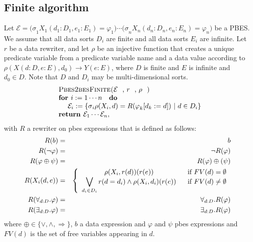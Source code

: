 \documentclass{article}
\begin{document}
\subsection{Finite algorithm}

Let $\mathcal{E=(\sigma }_{1}X_{1}(d_{1}:D_{1},e_{1}:E_{1})=\varphi
_{1})\cdots \mathcal{(\sigma }_{n}X_{n}(d_{n}:D_{n},e_{n}:E_{n})=\varphi
_{n})$ be a PBES. We assume that all data sorts $D_{i}$ are finite and all
data sorts $E_{i}$ are infinite. Let $r$ be a data rewriter, and let $\rho $
be an injective function that creates a unique predicate variable from a
predicate variable name and a data value according to $\rho
(X(d:D,e:E),d_{0})\rightarrow Y(e:E)$, where $D$ is finite and $E$ is
infinite and $d_{0}\in D$. Note that $D$ and $D_{i}$ may be
multi-dimensional sorts.%
\begin{equation*}
\begin{array}{l}
\text{\textsc{Pbes2besFinite(}}\mathcal{E}\text{, }r\text{, }\rho \text{%
\textsc{)}} \\ 
\text{\textbf{for }}i:=1\cdots n\text{ \textbf{do}} \\ 
\qquad \mathcal{E}_{i}:=\{\mathcal{\sigma }_{i}\rho (X_{i},d)=R(\varphi
_{k}[d_{k}:=d])\ |\ d\in D_{i}\} \\ 
\text{\textbf{return }}\mathcal{E}_{1}\cdots \mathcal{E}_{n},%
\end{array}%
\end{equation*}%
with $R$ a rewriter on pbes expressions that is defined as follows:%
\begin{eqnarray*}
R(b) &=&b \\
R(\lnot \varphi ) &=&\lnot R(\varphi ) \\
R(\varphi \oplus \psi ) &=&R(\varphi )\oplus (\psi ) \\
R(X_{i}(d,e)) &=&\left\{ 
\begin{array}{cc}
\rho (X_{i},r(d))(r(e)) & \text{if }FV(d)=\emptyset \\ 
\dbigvee\limits_{d_{i}\in D_{i}}r(d=d_{i})\wedge \rho (X_{i},d_{i})(r(e)) & 
\text{if }FV(d)\neq \emptyset%
\end{array}%
\right. \\
R(\forall _{d:D}.\varphi ) &=&\forall _{d:D}.R(\varphi ) \\
R(\exists _{d:D}.\varphi ) &=&\exists _{d:D}.R(\varphi )
\end{eqnarray*}%
where $\oplus \in \{\vee ,\wedge ,\Rightarrow \}$, $b$ a data expression and 
$\varphi $ and $\psi $ pbes expressions and $FV(d)$ is the set of free
variables appearing in $d$.\newpage
\end{document}

